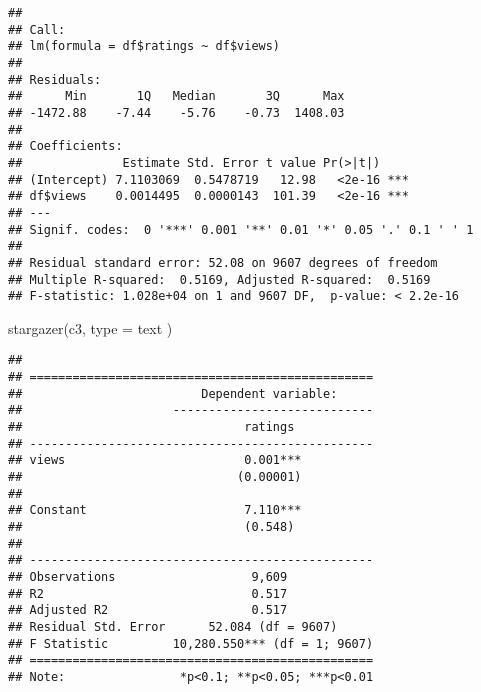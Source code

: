 \documentclass[
]{article}
\newenvironment{Shaded}{\begin{snugshade}}{\end{snugshade}}
\newcommand{\AttributeTok}[1]{\textcolor[rgb]{0.77,0.63,0.00}{#1}}
\newcommand{\FunctionTok}[1]{\textcolor[rgb]{0.00,0.00,0.00}{#1}}
\newcommand{\NormalTok}[1]{#1}
\newcommand{\OtherTok}[1]{\textcolor[rgb]{0.56,0.35,0.01}{#1}}
\newcommand{\SpecialCharTok}[1]{\textcolor[rgb]{0.00,0.00,0.00}{#1}}
\newcommand{\StringTok}[1]{\textcolor[rgb]{0.31,0.60,0.02}{#1}}
\begin{document}
\begin{verbatim}
## 
## Call:
## lm(formula = df$ratings ~ df$views)
## 
## Residuals:
##      Min       1Q   Median       3Q      Max 
## -1472.88    -7.44    -5.76    -0.73  1408.03 
## 
## Coefficients:
##              Estimate Std. Error t value Pr(>|t|)    
## (Intercept) 7.1103069  0.5478719   12.98   <2e-16 ***
## df$views    0.0014495  0.0000143  101.39   <2e-16 ***
## ---
## Signif. codes:  0 '***' 0.001 '**' 0.01 '*' 0.05 '.' 0.1 ' ' 1
## 
## Residual standard error: 52.08 on 9607 degrees of freedom
## Multiple R-squared:  0.5169, Adjusted R-squared:  0.5169 
## F-statistic: 1.028e+04 on 1 and 9607 DF,  p-value: < 2.2e-16
\end{verbatim}

\begin{Shaded}
\begin{Highlighting}[]
\FunctionTok{stargazer}\NormalTok{(c3, }\AttributeTok{type =} \StringTok{\textquotesingle{}text\textquotesingle{}}\NormalTok{ )}
\end{Highlighting}
\end{Shaded}

\begin{verbatim}
## 
## ================================================
##                         Dependent variable:     
##                     ----------------------------
##                               ratings           
## ------------------------------------------------
## views                         0.001***          
##                              (0.00001)          
##                                                 
## Constant                      7.110***          
##                               (0.548)           
##                                                 
## ------------------------------------------------
## Observations                   9,609            
## R2                             0.517            
## Adjusted R2                    0.517            
## Residual Std. Error      52.084 (df = 9607)     
## F Statistic         10,280.550*** (df = 1; 9607)
## ================================================
## Note:                *p<0.1; **p<0.05; ***p<0.01
\end{verbatim}

\begin{Shaded}
\end{Shaded}
\end{document}
